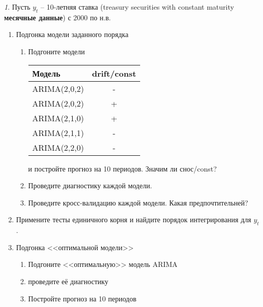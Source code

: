 \documentclass[12pt]{article}
\theoremstyle{remark}
\newtheorem{exercise}{}[subsection]
\begin{document}
\begin{exercise}
Пусть \(y_t\) -- 10-летняя ставка (treasury securities  with constant maturity 
\textbf{месячные данные}) с 2000 по н.в.
\begin{enumerate}
	\item Подгонка модели заданного порядка
	\begin{enumerate}
		\item Подгоните модели
		\begin{center}
		\begin{tabular}{l|c}
			Модель & drift/const \\ \hline
			ARIMA(2,0,2) & - \\
			ARIMA(2,0,2) & + \\
			ARIMA(2,1,0) & + \\
			ARIMA(2,1,1) & - \\
			ARIMA(2,2,0) & - \\ \hline
		\end{tabular}
		\end{center} 
		и постройте прогноз на 10 периодов. Значим ли снос/const?
		\item Проведите диагностику каждой модели.
		\item Проведите кросс-валидацию каждой модели. Какая предпочтительней?
	\end{enumerate}
	\item Примените тесты единичного корня и найдите порядок интегрирования для \(y_t\). 
	\item Подгонка <<оптимальной модели>>
	\begin{enumerate}
		\item Подгоните <<оптимальную>> модель ARIMA
		\item проведите её диагностику
		\item Постройте прогноз на 10 периодов
	\end{enumerate}
\end{enumerate}
\end{exercise}
\end{document}
